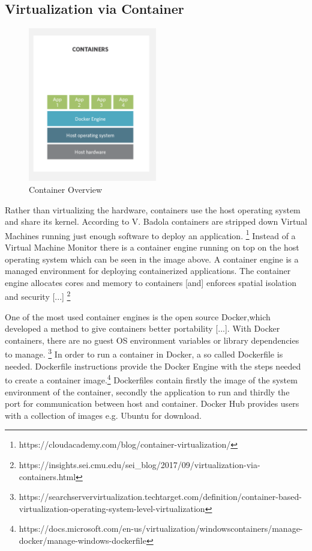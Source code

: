\documentclass[utf8,biblatex]{lni}
\begin{document}
\subsection{Virtualization via Container}

\begin{figure}
  \centering
  \includegraphics[width=0.5\textwidth]{Container.pdf}
  \caption{Container Overview}
  \label{img:container}
\end{figure}

Rather than virtualizing the hardware, containers use the host operating system and share its kernel. According to V. Badola containers are stripped down Virtual Machines running just enough software to deploy an application. \footnote{https://cloudacademy.com/blog/container-virtualization/} Instead of a Virtual Machine Monitor there is a container engine running on top on the host operating system which can be seen in the image above. \glqq A container engine is a managed environment for deploying containerized applications. The container engine allocates cores and memory to containers [and] enforces spatial isolation and security [...] \glqq \footnote{https://insights.sei.cmu.edu/sei_blog/2017/09/virtualization-via-containers.html} 

One of the most used container engines is the open source Docker,\glqq [...] which developed a method to give containers better portability [...]. With Docker containers, there are no guest OS environment variables or library dependencies to manage. \glqq \footnote{https://searchservervirtualization.techtarget.com/definition/container-based-virtualization-operating-system-level-virtualization} In order to run a container in Docker, a so called Dockerfile is needed. \glqq Dockerfile instructions provide the Docker Engine with the steps needed to create a container image.\glqq \footnote{https://docs.microsoft.com/en-us/virtualization/windowscontainers/manage-docker/manage-windows-dockerfile} Dockerfiles contain firstly the image of the system environment of the container, secondly the application to run and thirdly the port for communication between host and container. Docker Hub provides users with a collection of images e.g. Ubuntu for download.
\end{document}
